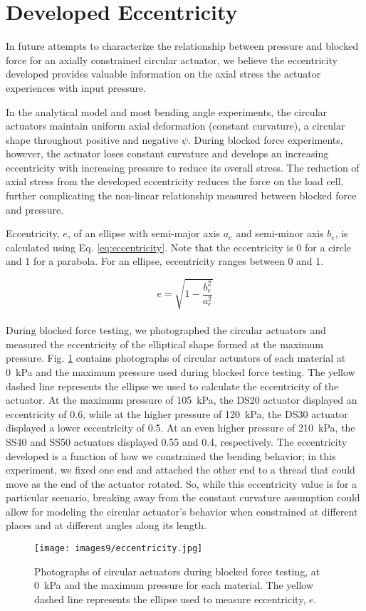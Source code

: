 \clearpage
\section{Developed Eccentricity}
\label{section:eccentricity}

In future attempts to characterize the relationship between pressure and blocked force for an axially constrained circular actuator, we believe the eccentricity developed provides valuable information on the axial stress the actuator experiences with input pressure. 

In the analytical model and most bending angle experiments, the circular actuators maintain uniform axial deformation (constant curvature), a circular shape throughout positive and negative $\psi$. During blocked force experiments, however, the actuator loses constant curvature and develops an increasing eccentricity with increasing pressure to reduce its overall stress. The reduction of axial stress from the developed eccentricity reduces the force on the load cell, further complicating the non-linear relationship measured between blocked force and pressure. 

Eccentricity, $e$, of an ellipse with semi-major axis $a_e$ and semi-minor axis $b_e$, is calculated using Eq. \ref{eq:eccentricity}. Note that the eccentricity is 0 for a circle and 1 for a parabola. For an ellipse, eccentricity ranges between 0 and 1. 

\begin{equation}
    e = \sqrt{1-\frac{b_e^2}{a_e^2}}
    \label{eq:eccentricity}
\end{equation}
\\
During blocked force testing, we photographed the circular actuators and measured the eccentricity of the elliptical shape formed at the maximum pressure. Fig. \ref{fig:eccentricity} contains photographs of circular actuators of each material at 0~kPa and the maximum pressure used during blocked force testing. The yellow dashed line represents the ellipse we used to calculate the eccentricity of the actuator. At the maximum pressure of 105~kPa, the DS20 actuator displayed an eccentricity of 0.6, while at the higher pressure of 120~kPa, the DS30 actuator displayed a lower eccentricity of 0.5. At an even higher pressure of 210~kPa, the SS40 and SS50 actuators displayed 0.55 and 0.4, respectively. The eccentricity developed is a function of how we constrained the bending behavior; in this experiment, we fixed one end and attached the other end to a thread that could move as the end of the actuator rotated. So, while this eccentricity value is for a particular scenario, breaking away from the constant curvature assumption could allow for modeling the circular actuator's behavior when constrained at different places and at different angles along its length.
\\
\begin{figure}[ht]
    \centering
     \texttt{[image: images9/eccentricity.jpg]}
    \caption{Photographs of circular actuators during blocked force testing, at 0~kPa and the maximum pressure for each material. The yellow dashed line represents the ellipse used to measure eccentricity, $e$.}
    \label{fig:eccentricity}
\end{figure}